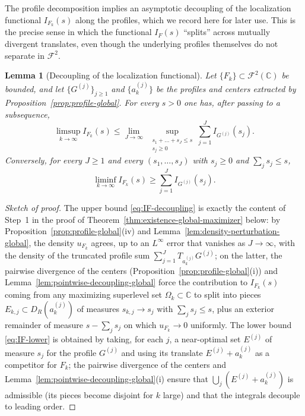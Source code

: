 \documentclass[a4paper,11pt,reqno]{amsart}
\numberwithin{equation}{section}
\theoremstyle{plain} %
\newtheorem{lemma}{Lemma}[section]
\theoremstyle{definition} %
\theoremstyle{remark}
\newcommand{\C}{\mathbb{C}}
\begin{document}
The profile decomposition implies an asymptotic decoupling of the
localization functional \(I_{F_k}(s)\) along the profiles, which we
record here for later use. This is the precise sense in which the
functional \(I_F(s)\) ``splits'' across mutually divergent translates,
even though the underlying profiles themselves do not separate in
\(\mathcal F^2\).

\begin{lemma}[Decoupling of the localization functional]\label{lem:decoupling-IF}
Let \(\{F_k\}\subset \mathcal F^2(\C)\) be bounded, and let
\(\{G^{(j)}\}_{j\ge 1}\) and \(\{a_k^{(j)}\}\) be the profiles and centers
extracted by Proposition~\ref{prop:profile-global}. For every \(s>0\) one
has, after passing to a subsequence,
\begin{equation}\label{eq:IF-decoupling}
\limsup_{k\to\infty} I_{F_k}(s)
\le
\lim_{J\to\infty}\;\sup_{\substack{s_1+\dots+s_J\le s \\ s_j\ge 0}}
\sum_{j=1}^J I_{G^{(j)}}(s_j).
\end{equation}
Conversely, for every \(J\ge 1\) and every \((s_1,\dots,s_J)\) with
\(s_j\ge 0\) and \(\sum_j s_j\le s\),
\begin{equation}\label{eq:IF-lower}
\liminf_{k\to\infty} I_{F_k}(s)
\ge
\sum_{j=1}^J I_{G^{(j)}}(s_j).
\end{equation}
\end{lemma}

\begin{proof}[Sketch of proof]
The upper bound \eqref{eq:IF-decoupling} is exactly the content of
Step~1 in the proof of Theorem~\ref{thm:existence-global-maximizer}
below: by Proposition~\ref{prop:profile-global}(iv) and
Lemma~\ref{lem:density-perturbation-global}, the density \(u_{F_k}\)
agrees, up to an \(L^\infty\) error that vanishes as \(J\to\infty\), with
the density of the truncated profile sum
\(\sum_{j=1}^J T_{a_k^{(j)}}G^{(j)}\); on the latter, the pairwise
divergence of the centers (Proposition~\ref{prop:profile-global}(i)) and
Lemma~\ref{lem:pointwise-decoupling-global} force the contribution to
\(I_{F_k}(s)\) coming from any maximizing superlevel set
\(\Omega_k\subset\C\) to split into pieces \(E_{k,j}\subset
D_R(a_k^{(j)})\) of measures \(s_{k,j}\to s_j\) with \(\sum_j s_j\le s\),
plus an exterior remainder of measure \(s-\sum_j s_j\) on which
\(u_{F_k}\to 0\) uniformly. The lower bound \eqref{eq:IF-lower} is
obtained by taking, for each \(j\), a near-optimal set \(E^{(j)}\) of
measure \(s_j\) for the profile \(G^{(j)}\) and using its translate
\(E^{(j)}+a_k^{(j)}\) as a competitor for \(F_k\); the pairwise
divergence of the centers and
Lemma~\ref{lem:pointwise-decoupling-global}(i) ensure that
\(\bigcup_j(E^{(j)}+a_k^{(j)})\) is admissible (its pieces become
disjoint for \(k\) large) and that the integrals decouple to leading
order.
\end{proof}
\end{document}
